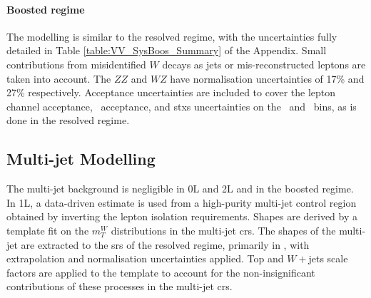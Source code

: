 \paragraph{Boosted regime} The modelling is similar to the resolved regime, with the uncertainties fully detailed in Table \ref{table:VV_SysBoos_Summary} of the Appendix. Small contributions from misidentified $W$ decays as jets or mis-reconstructed leptons are taken into account. The $ZZ$ and $WZ$ have normalisation uncertainties of 17\% and 27\% respectively. Acceptance uncertainties are included to cover the lepton channel acceptance, \ptv\ acceptance, and \gls{stxs} uncertainties on the \ptv\ and \nj\ bins, as is done in the resolved regime.

\subsection{Multi-jet Modelling}\label{sec-modMultiJ} 
The multi-jet background is negligible in 0L and 2L and in the boosted regime. In 1L, a data-driven estimate is used from a high-purity multi-jet control region obtained by inverting the lepton isolation requirements. Shapes are derived by a template fit on the $m_T^W$ distributions in the multi-jet \glspl{cr}. The shapes of the multi-jet are extracted to the \glspl{sr} of the resolved regime, primarily in \vhc, with extrapolation and normalisation uncertainties applied. Top and $W+$jets scale factors are applied to the template to account for the non-insignificant contributions of these processes in the multi-jet \glspl{cr}.